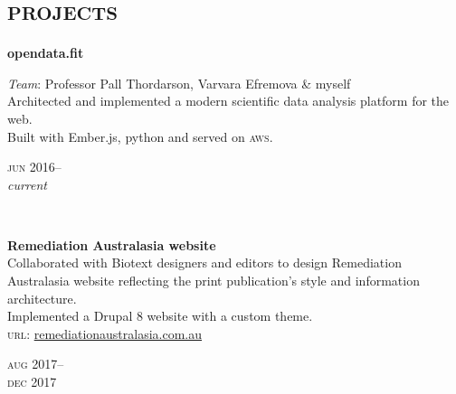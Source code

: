 
\vspace{-0.6cm}
\section*{\textsc{projects}}
\vspace{-0.2cm}

\begin{minipage}[t]{\mainboxwidth\textwidth}
\textbf{opendata.fit}\\
{\small
\textit{Team}: Professor Pall Thordarson, Varvara Efremova \& myself\\
Architected and implemented a modern scientific data analysis platform for the web.\\
Built with Ember.js, python and served on \textsc{aws}.\\
\par}
\end{minipage}
\begin{minipage}[t]{\detailboxwidth\textwidth}
{
\hfill \textsc{jun} 2016--\\ 
\hspace*{0pt} \hfill \textit{current}
\par
}
\end{minipage}
\\

\begin{minipage}[t]{\mainboxwidth\textwidth}
\textbf{Remediation Australasia website}\\
{\small
Collaborated with Biotext designers and editors to design Remediation Australasia website reflecting
the print publication's style and information architecture. \\
Implemented a Drupal 8 website with a custom theme. \\
\textsc{url}: \href{https://www.remediationaustralasia.com.au/}{remediationaustralasia.com.au} 
}
\\
\end{minipage}
\begin{minipage}[t]{\detailboxwidth\textwidth}
{
\hfill \textsc{aug} 2017--\\ 
\hspace*{0pt} \hfill \textsc{dec} 2017
\par
}
\end{minipage}
\\


